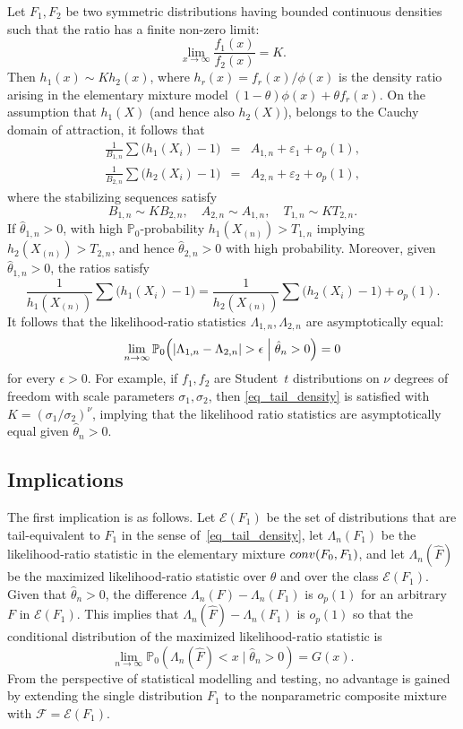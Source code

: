 \documentclass[11pt]{article}
\theoremstyle{definition}
\def\Prob{{\mathbb P}}
\def\F{{\mathcal F}}
\def\conv{\mathop{\rm conv}\nolimits}
\def\E{{\mathcal E}}
\def\Xmax{X_{(n)}}
\begin{document}
Let $F_1, F_2$ be two symmetric distributions having bounded continuous densities such that the  ratio has a finite non-zero limit:
\begin{equation}\label{eq_tail_density}
\lim_{x \to\infty} \frac{f_1(x)} {f_2(x)} = K.
\end{equation}
Then $h_1(x) \sim K h_2(x)$, where $h_r(x) = f_r(x)/\phi(x)$ is the density ratio arising in the elementary mixture model
$(1-\theta) \phi(x) + \theta f_r(x)$.
On the assumption that $h_1(X)$ (and hence also $h_2(X)$), belongs to the Cauchy domain of attraction, it follows that
\begin{eqnarray*}
	\frac 1 {B_{1,n}} \sum \bigl(h_1(X_i) - 1\bigr) &=& A_{1,n} + \varepsilon_1 + o_p(1), \\
	\frac 1 {B_{2,n}} \sum \bigl(h_2(X_i) - 1\bigr) &=& A_{2,n} + \varepsilon_2 + o_p(1),
\end{eqnarray*}
where the stabilizing sequences satisfy
\[
B_{1,n} \sim K B_{2,n}, \quad A_{2,n} \sim A_{1,n}, \quad T_{1,n}  \sim K T_{2,n}.
\]
If $\hat\theta_{1,n} > 0$, with high $\Prob_0$-probability $h_1(\Xmax) > T_{1,n}$ implying $h_2(\Xmax) > T_{2,n}$, and hence $\hat\theta_{2,n} > 0$ with high probability.
Moreover, given $\hat\theta_{1,n} > 0$, the ratios satisfy
\[
\frac 1 {h_1(\Xmax)} \sum \bigl(h_1(X_i) - 1\bigr) = \frac 1 {h_2(\Xmax)} \sum \bigl(h_2(X_i) - 1\bigr) + o_p(1).
\]
It follows that the likelihood-ratio statistics $\Lambda_{1,n}, \Lambda_{2,n}$ are asymptotically equal:
\[
\lim_{n\to\infty} \Prob_0\Bigl(|\Lambda_{1,n} - \Lambda_{2,n}| > \epsilon \mathrel{\Big |} \hat\theta_n > 0 \Bigr) = 0
\]
for every $\epsilon > 0$.
For example, if $f_1, f_2$ are Student~$t$ distributions on $\nu$ degrees of freedom with scale parameters $\sigma_1, \sigma_2$, then \eqref{eq_tail_density} is satisfied with $K = (\sigma_1/\sigma_2)^\nu$, implying that the likelihood ratio statistics are asymptotically equal given $\hat\theta_n > 0$.

\subsection{Implications}\label{secImplications}
The first implication is as follows.
Let $\E(F_1)$ be the set of distributions that are tail-equivalent to $F_1$
in the sense of~\eqref{eq_tail_density},
let $\Lambda_n(F_1)$ be the likelihood-ratio statistic in the elementary mixture $\conv(F_0, F_1)$,
and let $\Lambda_n(\hat F)$ be the maximized likelihood-ratio statistic over $\theta$ and over the class $\mathcal{E}(F_1)$. Given that $\hat\theta_n > 0$, the difference $\Lambda_n(F) - \Lambda_n(F_1)$ is $o_p(1)$ for an arbitrary $F$ in $\mathcal{E}(F_1)$. This implies that $\Lambda_n(\hat F) - \Lambda_n(F_1)$ is $o_p(1)$ so that
the conditional distribution of the maximized likelihood-ratio statistic is
\[
\lim_{n \to \infty} \Prob_0(\Lambda_n(\hat F) < x \mid \hat\theta_n >0) = G(x).
\]
From the perspective of statistical modelling and testing, no advantage is gained by extending the single distribution $F_1$
to the nonparametric composite mixture with $\F = \E(F_1)$.
\end{document}

